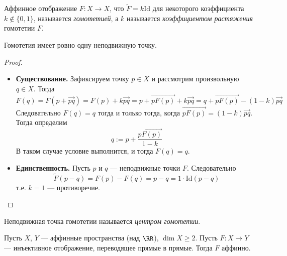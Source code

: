 \documentclass[12pt,a4paper]{article}
\newcommand{\Id}{\ensuremath{\mathrm{Id}}\xspace}
\begin{document}
    \begin{definition}
        Аффинное отображение $F: X \to X$, что $\widetilde{F} = k \Id$ для некоторого коэффициента $k \notin \{0, 1\}$, называется \emph{гомотетией}, а $k$ называется \emph{коэффициентом растяжения} гомотетии $F$.
    \end{definition}

    \begin{theorem}
        Гомотетия имеет ровно одну неподвижную точку.
    \end{theorem}

    \begin{proof}
        \begin{itemize}
            \item \textbf{Существование.} Зафиксируем точку $p \in X$ и рассмотрим произвольную $q \in X$. Тогда
                \[
                    F(q)
                    = F(p + \overrightarrow{pq})
                    = F(p) + k\overrightarrow{pq}
                    = p + \overrightarrow{pF(p)} + k\overrightarrow{pq}
                    = q + \overrightarrow{pF(p)} - (1-k)\overrightarrow{pq}
                \]
                Следовательно $F(q) = q$ тогда и только тогда, когда $\overrightarrow{pF(p)} = (1-k)\overrightarrow{pq}$. Тогда определим
                \[
                    q := p + \frac{\overrightarrow{pF(p)}}{1-k}
                \]
                В таком случае условие выполнится, и тогда $F(q) = q$.
            \item \textbf{Единственность.} Пусть $p$ и $q$ --- неподвижные точки $F$. Следовательно
                \[
                    \widetilde{F}(p-q)
                    = F(p) - F(q)
                    = p - q
                    = 1 \cdot \Id(p - q)
                \]
                т.е. $k = 1$ --- противоречие.
        \end{itemize}
    \end{proof}

    \begin{definition}
        Неподвижная точка гомотетии называется \emph{центром гомотетии}.
    \end{definition}

    \begin{theorem}\label{main-affine-theorem}
        Пусть $X$, $Y$ --- аффинные пространства (над $\RR$), $\dim X \geqslant 2$. Пусть $F: X \to Y$ --- инъективное отображение, переводящее прямые в прямые. Тогда $F$ аффинно.
    \end{theorem}
\end{document}
